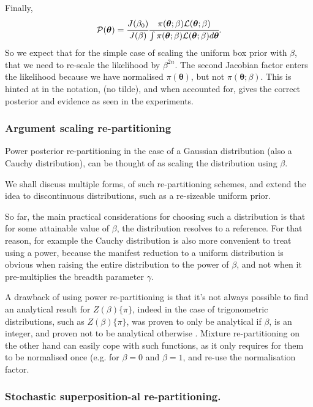 \documentclass[usenatbib]{mnras}
\begin{document}
Finally, 
\begin{equation*}
 {\cal P}(\bm{\theta}) = \cfrac{J(\beta_{0})}{J(\beta)} \cfrac{\pi(\bm{\theta}; \beta) {\cal L}(\bm{\theta}; \beta)}{\int \pi(\bm{\theta}; \beta) {\cal L}(\bm{\theta}; \beta) d \bm{\theta}}.
\end{equation*}
So we expect that for the simple case of scaling the uniform box
prior with \(\beta\), that we need to re-scale the likelihood by
\(\beta^{2n}\). The second Jacobian factor enters the likelihood because
we have normalised \(\pi(\bm{\theta})\), but not \(\pi(\bm{\theta}; \beta)\). This is hinted at in
the notation, (no tilde), and when accounted for, gives  the correct
posterior and evidence as seen in the experiments. 


\subsubsection{Argument scaling re-partitioning}
\label{sec:orgbbf7292}

Power posterior re-partitioning in the case of a Gaussian
distribution (also a Cauchy distribution), can be thought of as
scaling the distribution using \(\beta\).

We shall discuss multiple forms, of such re-partitioning schemes,
and extend the idea to discontinuous distributions, such as a
re-sizeable uniform prior.  

So far, the main practical considerations for choosing such a
distribution is that for some attainable value of \(\beta\), the
distribution resolves to a reference. For that reason, for example
the Cauchy distribution is also more convenient to treat using a
power, because the manifest reduction to a uniform distribution is
obvious when raising the entire distribution to the power of
\(\beta\), and not when it pre-multiplies the breadth parameter
\(\gamma\).

A drawback of using power re-partitioning is that it's not always
possible to find an analytical result for \(Z(\beta)\{\pi\}\), indeed
in the case of trigonometric distributions, such as \(Z(\beta)\{\pi\}\),
was proven to only be analytical if \(\beta\), is an integer, and
proven not to be analytical otherwise \citep{Liouville1837}. Mixture
re-partitioning on the other hand can easily cope with such
functions, as it only requires for them to be normalised once
(e.g. for \(\beta=0\) and \(\beta=1\), and re-use the normalisation
factor.


\subsubsection{Stochastic superposition-al re-partitioning.}
\label{sec:org435cbe9}
\end{document}
